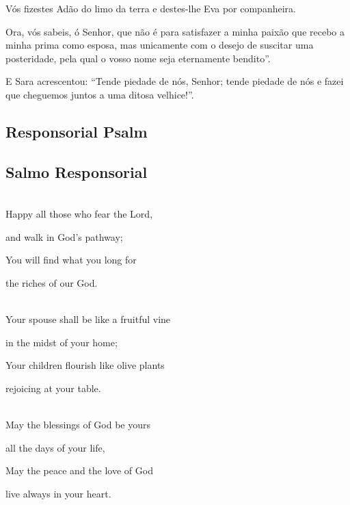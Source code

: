 \documentclass[10pt,a5]{article}
\newcommand \subsect[2] {\subsection*{#1} \switchcolumn \subsection*{#2} \switchcolumn*}
\begin{document}
\begin{paracol}{2}
Vós fizestes Adão do limo da terra e destes-lhe Eva por companheira.

Ora, vós sa­beis, ó Senhor, que não é para satisfazer a minha paixão que recebo a minha prima como esposa, mas unicamente com o desejo de suscitar uma posteridade, pela qual o vosso nome seja eternamente bendito”.

E Sara acrescentou: “Tende piedade de nós, Senhor; tende piedade de nós e fazei que cheguemos juntos a uma ditosa velhice!”.


 \switchcolumn*

 \subsect{Responsorial Psalm}{Salmo Responsorial}

 \\

 Happy all those who fear the Lord,

 \hspace*{2em}and walk in God's pathway;

You will find what you long for

 \hspace*{2em}the riches of our God.

 \\

 Your spouse shall be like a fruitful vine

 \hspace*{2em}in the midst of your home;

 Your children flourish like olive plants

 \hspace*{2em}rejoicing at your table.

 \\

May the blessings of God be yours

 \hspace*{2em}all the days of your life,

 May the peace and the love of God

 \hspace*{2em}live always in your heart.

 \\



\end{paracol}
\end{document}
